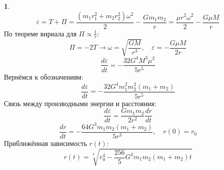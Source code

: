 \documentclass[12pt]{article}
\theoremstyle{definition}
\newtheorem{zad}{}[section]
\begin{document}
\begin{zad}
\begin{equation}
\end{equation}
\begin{equation}
    \varepsilon=T+\Pi=\frac{(m_1r_1^2+m_2r_2^2)\omega^2}{2}-\frac{Gm_1m_2}{r}=\frac{\mu r^2\omega^2}{2}-\frac{G\mu M}{r}
\end{equation}
По теореме вириала для $\Pi\propto\frac{1}{r}$:
\begin{equation}
    \Pi=-2T\rightarrow \omega=\sqrt{\frac{GM}{r^3}},\quad\varepsilon=-\frac{G\mu M}{2r}
\end{equation}
\begin{equation}
    \frac{d\varepsilon}{dt}=-\frac{32G^4M^3\mu^2}{5r^5}
\end{equation}
Вернёмся к обозначениям:
\begin{equation}
    \boxed{\frac{d\varepsilon}{dt}=-\frac{32G^4m_1^2m_2^2(m_1+m_2)}{5r^5}}
\end{equation}
Связь между производными энергии и расстояния:
\begin{equation}
    \frac{d\varepsilon}{dt}=\frac{Gm_1m_2}{2r^2}\frac{dr}{dt}
\end{equation}
\begin{equation}
    \frac{dr}{dt}=-\frac{64G^3m_1m_2(m_1+m_2)}{5r^3}, \quad r(0)=r_0
\end{equation}
Приближённая зависимость $r(t)$:
\begin{equation}
    \boxed{r(t)=\sqrt[4]{r_0^4-\frac{256}{5}G^3m_1m_2(m_1+m_2)t}}
\end{equation}
\end{zad}
\end{document}
